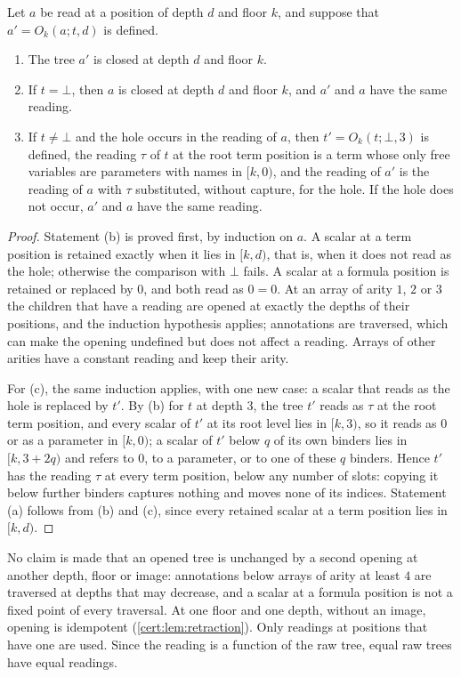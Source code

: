 \begin{lemma}\label{cert:lem:opening}
Let $a$ be read at a position of depth $d$ and floor $k$, and suppose that
$a'=O_k(a;t,d)$ is defined.
\begin{enumerate}[label=(\alph*)]
\item The tree $a'$ is closed at depth $d$ and floor $k$.
\item If $t=\bot$, then $a$ is closed at depth $d$ and floor $k$, and $a'$ and
$a$ have the same reading.
\item If $t\neq\bot$ and the hole occurs in the reading of $a$, then
$t'=O_k(t;\bot,3)$ is defined, the reading $\tau$ of $t$ at the root term
position is a term whose only free variables are parameters with names in
$[k,0)$, and the reading of $a'$ is the reading of $a$ with $\tau$
substituted, without capture, for the hole. If the hole does not occur, $a'$
and $a$ have the same reading.
\end{enumerate}
\end{lemma}
\begin{proof}
Statement (b) is proved first, by induction on $a$. A scalar at a term
position is retained exactly when it lies in $[k,d)$, that is, when it does
not read as the hole; otherwise the comparison with $\bot$ fails. A scalar at
a formula position is retained or replaced by $0$, and both read as $0=0$. At
an array of arity $1$, $2$ or $3$ the children that have a reading are opened
at exactly the depths of their positions, and the induction hypothesis
applies; annotations are traversed, which can make the opening undefined but
does not affect a reading. Arrays of other arities have a constant reading and
keep their arity.

For (c), the same induction applies, with one new case: a scalar that reads as
the hole is replaced by $t'$. By (b) for $t$ at depth $3$, the tree $t'$ reads
as $\tau$ at the root term position, and every scalar of $t'$ at its root
level lies in $[k,3)$, so it reads as $0$ or as a parameter in $[k,0)$; a
scalar of $t'$ below $q$ of its own binders lies in $[k,3+2q)$ and refers to
$0$, to a parameter, or to one of these $q$ binders. Hence $t'$ has the
reading $\tau$ at every term position, below any number of slots: copying it
below further binders captures nothing and moves none of its indices.
Statement (a) follows from (b) and (c), since every retained scalar at a term
position lies in $[k,d)$.
\end{proof}

No claim is made that an opened tree is unchanged by a second opening at
another depth, floor or image: annotations below arrays of arity at least $4$
are traversed at depths that may decrease, and a scalar at a formula position
is not a fixed point of every traversal. At one floor and one depth, without
an image, opening is idempotent (\cref{cert:lem:retraction}). Only readings at
positions that have one are used. Since the
reading is a function of the raw tree, equal raw trees have equal readings.

